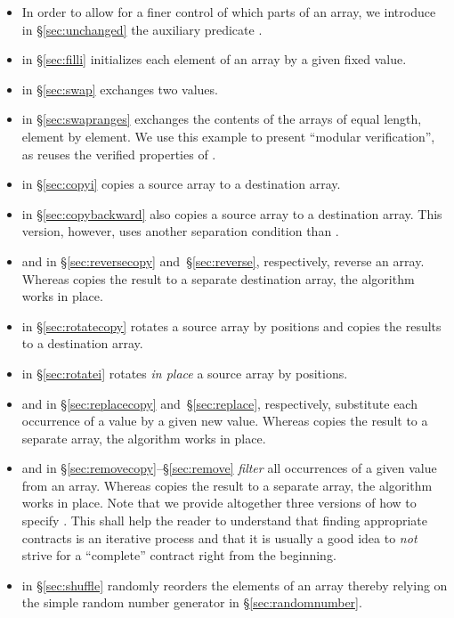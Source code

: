 \begin{itemize}

\item
In order to allow for a finer control of which parts of an array,
we introduce in \S\ref{sec:unchanged} the auxiliary predicate \Unchanged.

\item \filli in \S\ref{sec:filli}
initializes each element of an array by a given fixed value.

\item \swap in \S\ref{sec:swap} exchanges two values.

\item \swapranges 
in \S\ref{sec:swapranges} exchanges the contents of the arrays of equal length, element
by element.
We use this example to present ``modular verification'',
as \swapranges reuses the verified properties of \swap.

\item \copyi 
in \S\ref{sec:copyi} 
copies a source array to a destination array.

\item \copybackward 
in \S\ref{sec:copybackward} also
copies a source array to a destination array. 
This version, however, uses another separation condition than \copyi.

\item \reversecopy and \reverse 
in \S\ref{sec:reversecopy} and~\S\ref{sec:reverse}, respectively,
reverse an array.
Whereas \reversecopy copies the result to a separate destination array, 
the \reverse algorithm works in place.

\item \rotatecopy 
in \S\ref{sec:rotatecopy}
rotates a source array by  positions and copies the results to a
destination array.

\item \rotatei 
in \S\ref{sec:rotatei}
rotates \emph{in place} a source array by  positions.

\item \replacecopy and \replace
in \S\ref{sec:replacecopy} and~\S\ref{sec:replace}, respectively,
substitute each occurrence of a value by a given new value.
Whereas \replacecopy copies the result to a separate array, 
the \replace algorithm works in place.

\item \removecopy and \remove in \S\ref{sec:removecopy}--\S\ref{sec:remove}
\emph{filter} all occurrences of a given value from an array.
Whereas \removecopy copies the result to a separate array, 
the \remove algorithm works in place.
Note that we provide altogether three versions of how to specify \removecopy.
This shall help the reader to understand that finding appropriate contracts
is an iterative process and that it is usually a good idea to \emph{not} strive
for a ``complete'' contract right from the beginning.

\item \shuffle in \S\ref{sec:shuffle} randomly reorders the elements of an array
thereby relying on the simple random number generator \randomnumber in 
\S\ref{sec:randomnumber}.

\end{itemize}

